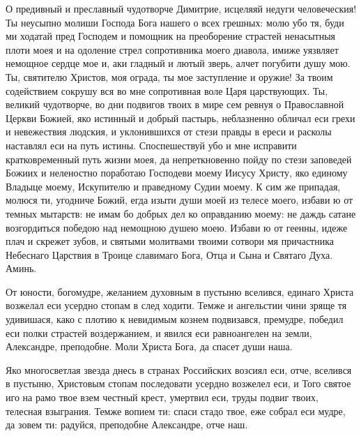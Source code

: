 О предивный и преславный чудотворче Димитрие, исцеляяй недуги человеческия! Ты неусыпно молиши Господа Бога нашего о всех грешных: молю убо тя, буди ми ходатай пред Господем и помощник на преоборение страстей ненасытныя плоти моея и на одоление стрел сопротивника моего диавола, имиже уязвляет немощное сердце мое и, аки гладный и лютый зверь, алчет погубити душу мою. Ты, святителю Христов, моя ограда, ты мое заступление и оружие! За твоим содействием сокрушу вся во мне сопротивная воле Царя царствующих. Ты, великий чудотворче, во дни подвигов твоих в мире сем ревнуя о Православной Церкви Божией, яко истинный и добрый пастырь, неблазненно обличал еси грехи и невежествия людския, и уклонившихся от стези правды в ереси и расколы наставлял еси на путь истины. Споспешествуй убо и мне исправити кратковременный путь жизни моея, да непреткновенно пойду по стези заповедей Божиих и неленостно поработаю Господеви моему Иисусу Христу, яко единому Владыце моему, Искупителю и праведному Судии моему. К сим же припадая, молюся ти, угодниче Божий, егда изыти души моей из телесе моего, избави ю от темных мытарств: не имам бо добрых дел ко оправданию моему: не даждь сатане возгордиться победою над немощною душею моею. Избави ю от геенны, идеже плач и скрежет зубов, и святыми молитвами твоими сотвори мя причастника Небеснаго Царствия в Троице славимаго Бога, Отца и Сына и Святаго Духа. Аминь.
\longpage[2]{}\mychapterending

 


От юности, богомудре, желанием духовным в пустыню вселився, единаго Христа возжелал еси усердно стопам в след ходити. Темже и ангельстии чини зряще тя удивишася, како с плотию к невидимым кознем подвизався, премудре, победил еси полки страстей воздержанием, и явился еси равноангелен на земли, Александре, преподобне. Моли Христа Бога, да спасет души наша.




Яко многосветлая звезда днесь в странах Российских возсиял еси, отче, вселився в пустыню, Христовым стопам последовати усердно возжелел еси, и Того святое иго на рамо твое взем честный крест, умертвил еси, труды подвиг твоих, телесная взыграния. Темже вопием ти: спаси стадо твое, еже собрал еси мудре, да зовем ти: радуйся, преподобне Александре, отче наш.


